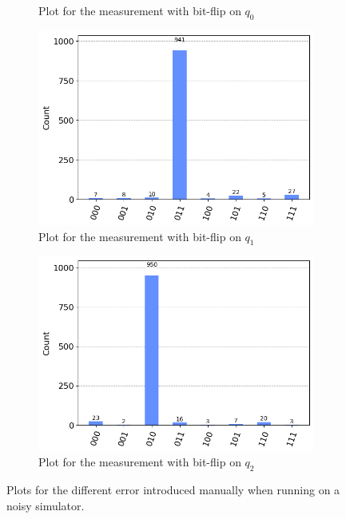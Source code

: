 \documentclass[11pt]{article}
\begin{document}
\begin{figure}[h!]
\begin{subfigure}{0.5\linewidth}
        \caption{Plot for the measurement with bit-flip on $q_0$}
    \end{subfigure}
    \begin{subfigure}{0.5\linewidth}
        \includegraphics[width=\linewidth]{outputs/measure_3_1.png}
        \caption{Plot for the measurement with bit-flip on $q_1$}
    \end{subfigure}
    \begin{subfigure}{0.5\linewidth}
        \includegraphics[width=\linewidth]{outputs/measure_3_2.png}
        \caption{Plot for the measurement with bit-flip on $q_2$}
    \end{subfigure}
    \caption{Plots for the different error introduced manually when running on a noisy simulator.}\label{fig:3_measure}
\end{figure}
\end{document}
